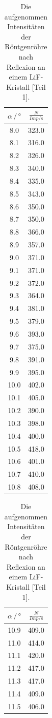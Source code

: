 \begin{table}
\centering
  \caption{Die aufgenommen Intensitäten der Röntgenröhre nach Reflexion an einem LiF-Kristall [Teil 1].}
  \begin{tabular}[t]{cc}
  \toprule
  $\alpha \,/\, \si{\degree} $ & $\frac{N}{Imp/\si{\second}}$\\
  \midrule
  8.0 & 323.0 \\
  8.1 & 316.0\\
  8.2 & 326.0\\
  8.3 & 340.0\\
  8.4 & 335.0\\
  8.5 & 343.0\\
  8.6 & 350.0\\
  8.7 & 350.0\\
  8.8 & 366.0\\
  8.9 & 357.0\\
  9.0 & 371.0\\
  9.1 & 371.0\\
  9.2 & 372.0\\
  9.3 & 364.0\\
  9.4 & 381.0\\
  9.5 & 379.0\\
  9.6 & 393.0\\
  9.7 & 375.0\\
  9.8 & 391.0\\
  9.9 & 395.0\\
  10.0 & 402.0\\
  10.1 & 405.0\\
  10.2 & 390.0\\
  10.3 & 398.0\\
  10.4 & 400.0\\
  10.5 & 418.0\\
  10.6 & 401.0\\
  10.7 & 410.0\\
  10.8 & 408.0\\
  \bottomrule
  \end{tabular}
  \begin{tabular}[t]{cc}
  \toprule
  $\alpha \,/\, \si{\degree} $ & $\frac{N}{Imp/\si{\second}}$ \\
  \midrule
  10.9 & 409.0\\
  11.0 & 414.0\\
  11.1 & 420.0\\
  11.2 & 417.0\\
  11.3 & 417.0\\
  11.4 & 409.0\\
  11.5 & 406.0\\

\end{tabular}
\end{table}

